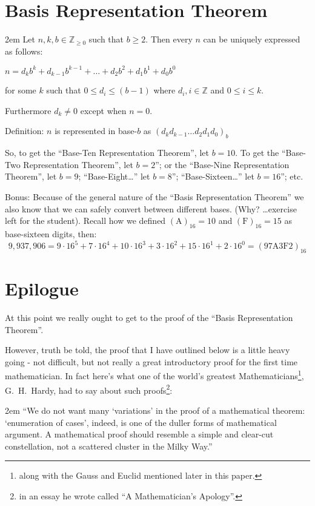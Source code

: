 \documentclass{article}
\newenvironment{jprIn}{\begin{adjustwidth}{2em}{}}{\end{adjustwidth}}
\begin{document}
\section*{Basis Representation Theorem}

\begin{jprIn}
Let $n,k,b\in \mathbb{Z}_{\ge 0}$ such that $b\ge2$.
Then every $n$ can be uniquely expressed as follows:

\hspace{3em}$n=d_kb^k+d_{k-1}b^{k-1}+\dots+d_2b^2+d_1b^1+d_0b^0$

for some $k$ such that $0 \le d_i \le (b-1)$ where $d_i,i\in\mathbb{Z}$ and $0 \le i \le k$.

Furthermore $d_k\ne0$ except when $n=0$.

Definition: $n$ is represented in base-$b$ as $(d_kd_{k-1}\dots{}d_2d_1d_0)_b$
\end{jprIn}
\bigskip

So, to get the ``Base-Ten Representation Theorem'', let $b=10$.
To get the ``Base-Two Representation Theorem'', let $b=2$''; or the ``Base-Nine Representation Theorem'',
let $b=9$; ``Base-Eight\dots{}'' let $b=8$''; ``Base-Sixteen\dots{}'' let $b=16$''; etc.

Bonus: Because of the general nature of the ``Basis Representation Theorem'' we also know that we can safely convert between
different bases. (Why? \dots{}exercise left for the student).  Recall how we defined $(\text{A})_{16}=10$
and $(\text{F})_{16}=15$ as base-sixteen digits, then:
\[9,937,906=9\cdot{}16^5+7\cdot{}16^4+10\cdot{}16^3+3\cdot{}16^2+15\cdot{}16^1+2\cdot{}16^0=(\text{97A3F2})_{16}\]

\section*{Epilogue}
At this point we really ought to get to the proof of the ``Basis Representation Theorem''.

However, truth be told, the proof that I have outlined below is a little heavy going - not difficult,
but not really a great introductory proof for the first time mathematician.
In fact here's what one of the
world's greatest Mathematicians\footnote{along with the Gauss and Euclid mentioned later in this paper.},
G.~H.~Hardy, had to say about such
proofs\footnote{in an essay he wrote called ``A Mathematician's Apology''.}:

\begin{jprIn}
``We do not want many `variations' in the proof of a mathematical
theorem: `enumeration of cases', indeed, is one
of the duller forms of mathematical argument. A mathematical proof
should resemble a simple and clear-cut constellation, not a scattered
cluster in the Milky Way.''
\end{jprIn}
\end{document}
